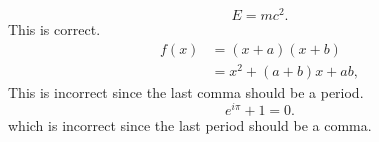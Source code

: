 \documentclass[preview]{standalone}
\newcommand{\tA}[1]{\textcolor{cA}{#1}}
\newcommand{\tD}[1]{\textcolor{cD}{#1}}
\begin{document}
\begin{equation*}
	E=mc^2.
\end{equation*}
This is \tA{correct}.
\begin{align}
	f(x) & = (x+a)(x+b)         \\
	     & = x^2 + (a+b)x + ab,
\end{align}
This is \tD{incorrect} since the last comma should be a period.
\begin{equation*}
	e^{i \pi}+1=0.
\end{equation*}
which is \tD{incorrect} since the last period should be a comma.
\end{document}
